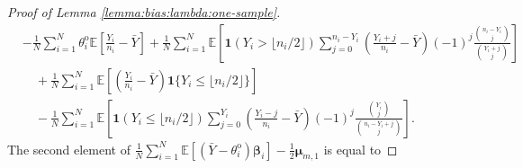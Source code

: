 \documentclass[12pt,letterpaper]{article}
\begin{document}
\begin{proof}[Proof of Lemma \ref{lemma:bias:lambda:one-sample}]
\begin{equation}\label{eq:bias:one-sample:1}
\begin{array}{rl}
&\displaystyle-\frac{1}{N}\sum_{i=1}^N\theta_i^{\mathrm{o}}\mathbb{E}\left[\frac{Y_i}{n_i}-\bar{Y}\right]+\frac{1}{N}\sum_{i=1}^N\mathbb{E}\left[\mathbf{1}(Y_{i} > \lfloor n_i/2\rfloor)\!\!\!\sum_{j=0}^{n_{i}-Y_{i}}\!\!\left(\frac{Y_i+j}{n_i}-\bar{Y}\right)(-1)^{j}\frac{\binom{n_i-Y_i}{j}}{\binom{Y_i+j}{j}}\right]\\
&\displaystyle\quad+\frac{1}{N}\sum_{i=1}^N\mathbb{E}\left[\left(\frac{Y_i}{n_i}-\bar{Y}\right)\mathbf{1}\{Y_i\leq \lfloor n_i/2\rfloor\}\right]\\
&\displaystyle\quad-\frac{1}{N}\sum_{i=1}^N\mathbb{E}\left[\mathbf{1}(Y_{i}\leq \lfloor n_i/2\rfloor)\sum_{j=0}^{Y_{i}}\left(\frac{Y_i-j}{n_i}-\bar{Y}\right)(-1)^{j}\frac{\binom{Y_i}{j}}{\binom{n_i-Y_i+j}{j}}\right].
\end{array}
\end{equation}
The second element of $\displaystyle\frac{1}{N}\sum_{i=1}^N\mathbb{E}\left[\left(\bar{Y}-\theta_i^{\mathrm{o}}\right)\boldsymbol{\beta}_i\right]-\frac{1}{2}\boldsymbol{\mu}_{m,1}$ is equal to 


\end{proof}
\end{document}
